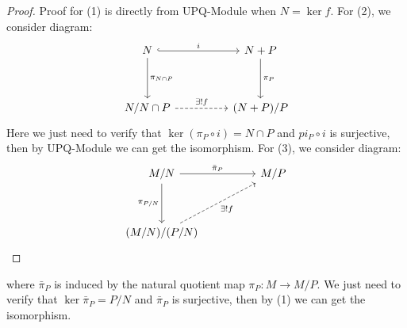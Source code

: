 \begin{proof}
    Proof for (1) is directly from UPQ-Module when \(N=\ker f\). For (2), we consider diagram:
\[\begin{tikzcd}
	N && {N+P} \\
	\\
	{N/{N \cap P}} && {(N+P)/P}
	\arrow["i", hook, from=1-1, to=1-3]
	\arrow["{\pi_{N\cap P}}", from=1-1, to=3-1]
	\arrow["{\pi_{P}}", from=1-3, to=3-3]
	\arrow["{\exists! f}", dashed, from=3-1, to=3-3]
\end{tikzcd}\]
Here we just need to verify that \(\ker(\pi_P \circ i) = N\cap P\) and \(pi_P \circ i\) is surjective, then by UPQ-Module we can get the isomorphism. For (3), we consider diagram:
\[\begin{tikzcd}
	{M/N} && {M/P} \\
	\\
	{(M/N)/(P/N)}
	\arrow["{\bar\pi_P}", from=1-1, to=1-3]
	\arrow["{\pi_{P/N}}"', from=1-1, to=3-1]
	\arrow["{\exists! f }"', dashed, from=3-1, to=1-3]
\end{tikzcd}\]
\end{proof}
where \(\bar{\pi}_P\) is induced by the natural quotient map \(\pi_P: M \to M/P\). We just need to verify that \(\ker \bar{\pi}_P = P/N\) and \(\bar{\pi}_P\) is surjective, then by (1) we can get the isomorphism.\\


